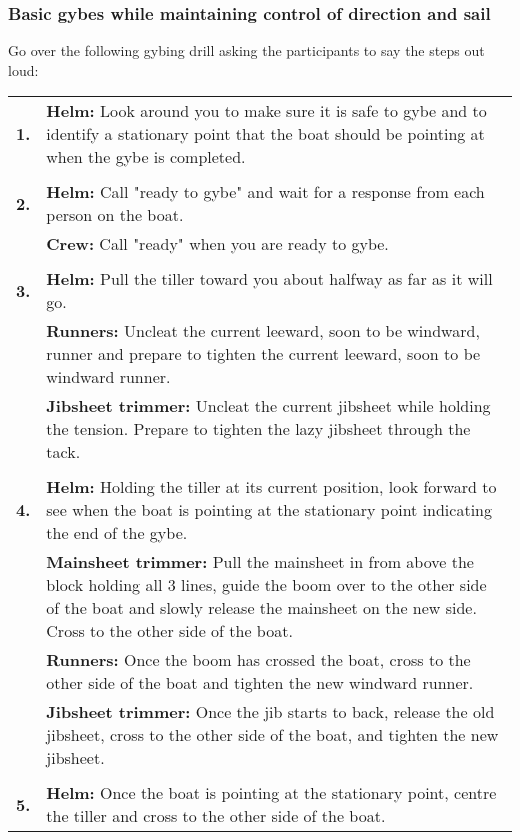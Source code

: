 \documentclass[12pt]{scrartcl}
\begin{document}
\subsubsection{Basic gybes while maintaining control of direction and sail} \label{subsubsec:basic gybe}

Go over the following gybing drill asking the participants to say the steps out loud:

\label{tab:gybing drill}
\begin{tabularx}{420pt}{lX}
	\centering
	\textbf{1.} & \textbf{Helm:} Look around you to make sure it is safe to gybe and to identify a stationary point that the boat should be pointing at when the gybe is completed. \\
	& \\
	\textbf{2.} & \textbf{Helm:} Call "ready to gybe" and wait for a response from each person on the boat. \\
	& \textbf{Crew:} Call "ready" when you are ready to gybe. \\
	& \\
	\textbf{3.} & \textbf{Helm:} Pull the tiller toward you about halfway as far as it will go. \\
	& \textbf{Runners:} Uncleat the current leeward, soon to be windward, runner and prepare to tighten the current leeward, soon to be windward runner. \\
	& \textbf{Jibsheet trimmer:} Uncleat the current jibsheet while holding the tension. Prepare to tighten the lazy jibsheet through the tack. \\
	& \\
	\textbf{4.} & \textbf{Helm:} Holding the tiller at its current position, look forward to see when the boat is pointing at the stationary point indicating the end of the gybe. \\
	& \textbf{Mainsheet trimmer:} Pull the mainsheet in from above the block holding all 3 lines, guide the boom over to the other side of the boat and slowly release the mainsheet on the new side. Cross to the other side of the boat. \\
	& \textbf{Runners:} Once the boom has crossed the boat, cross to the other side of the boat and tighten the new windward runner. \\
	& \textbf{Jibsheet trimmer:} Once the jib starts to back, release the old jibsheet, cross to the other side of the boat, and tighten the new jibsheet. \\
	& \\
	\textbf{5.} & \textbf{Helm:} Once the boat is pointing at the stationary point, centre the tiller and cross to the other side of the boat. \\
\end{tabularx}
\end{document}
